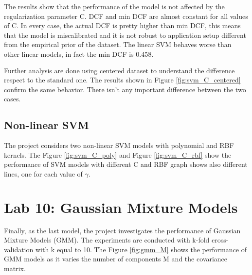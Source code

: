 \documentclass{article}
\begin{document}
The results show that the performance of the model is not affected by the regularization parameter C. DCF and min DCF are almost constant for all values of C. In every case, the actual DCF is pretty higher than min DCF, this means that the model is miscalibrated and it is not robust to application setup different from the empirical prior of the dataset. The linear SVM behaves worse than other linear models, in fact the min DCF is 0.458.

Further analysis are done using centered dataset to understand the difference respect to the standard one. The results shown in Figure \ref{fig:svm_C_centered} confirm the same behavior. There isn't any important difference between the two cases.

\subsection{Non-linear SVM}
The project considers two non-linear SVM models with polynomial and RBF kernels. The Figure \ref{fig:svm_C_poly} and Figure \ref{fig:svm_C_rbf} show the performance of SVM models with different C and RBF graph shows also different lines, one for each value of $\gamma$.


\section{Lab 10: Gaussian Mixture Models}
\label{sec:gmm}
Finally, as the last model, the project investigates the performance of Gaussian Mixture Models (GMM). The experiments are conducted with k-fold cross-validation with k equal to 10. The Figure \ref{fig:gmm_M} shows the performance of GMM models as it varies the number of components M and the covariance matrix.
\end{document}
